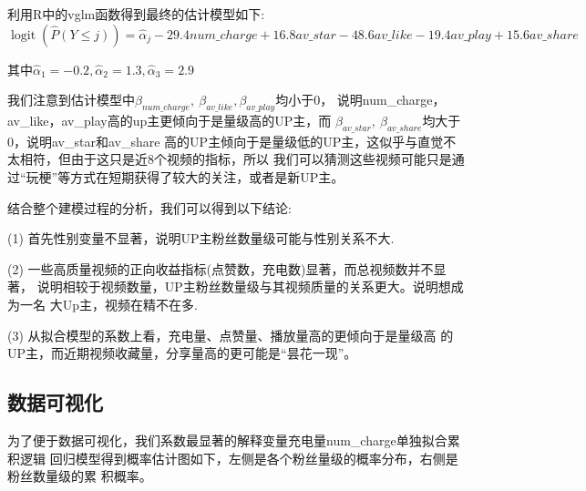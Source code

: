 \documentclass{ctexart}
\begin{document}
利用R中的vglm函数得到最终的估计模型如下:
\begin{equation*}
    \operatorname{logit}(\hat{P}(Y\le j))=\hat\alpha_j-29.4num\_charge+16.8av\_star-48.6av\_like-19.4av\_play+15.6av\_share
\end{equation*}

其中$\hat\alpha_1=-0.2,\hat\alpha_2=1.3,\hat\alpha_3=2.9$

我们注意到估计模型中$\beta_{num\_charge},\ \beta_{av\_like}, \beta_{av\_play}$均小于0，
说明num\_charge，av\_like，av\_play高的up主更倾向于是量级高的UP主，而
$\beta_{av\_star},\ \beta_{av\_share}$均大于0，说明av\_star和av\_share
高的UP主倾向于是量级低的UP主，这似乎与直觉不太相符，但由于这只是近8个视频的指标，所以
我们可以猜测这些视频可能只是通过“玩梗”等方式在短期获得了较大的关注，或者是新UP主。


结合整个建模过程的分析，我们可以得到以下结论:

(1) 首先性别变量不显著，说明UP主粉丝数量级可能与性别关系不大.

(2) 一些高质量视频的正向收益指标(点赞数，充电数)显著，而总视频数并不显著，
说明相较于视频数量，UP主粉丝数量级与其视频质量的关系更大。说明想成为一名
大Up主，视频在精不在多.

(3) 从拟合模型的系数上看，充电量、点赞量、播放量高的更倾向于是量级高
的UP主，而近期视频收藏量，分享量高的更可能是“昙花一现”。

\subsection{数据可视化}

为了便于数据可视化，我们系数最显著的解释变量充电量num\_charge单独拟合累积逻辑
回归模型得到概率估计图如下，左侧是各个粉丝量级的概率分布，右侧是粉丝数量级的累
积概率。
\end{document}
